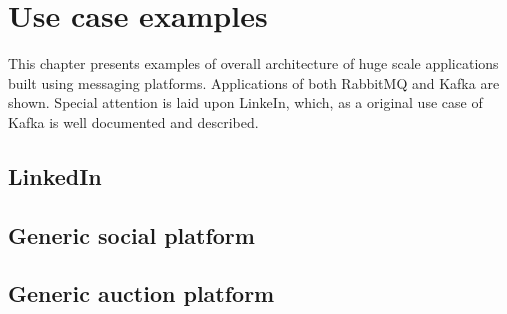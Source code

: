 \chapter{Use case examples}
\label{cha:examples}

This chapter presents examples of overall architecture of huge scale applications built using messaging platforms. Applications of both RabbitMQ and Kafka are shown. Special attention is laid upon LinkeIn, which, as a original use case of Kafka is well documented and described. 

\section{LinkedIn}
\label{sec:linkedIn}


\section{Generic social platform}
\label{sec:socialPlatform}


\section{Generic auction platform}
\label{sec:auctionPlatform}

